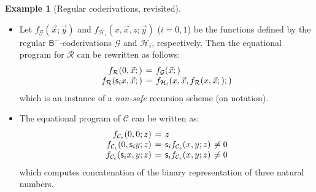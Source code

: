 \documentclass[manuscript,screen]{acmart}
\theoremstyle{definition}
\newtheorem{exmp}[thm]{Example}
\theoremstyle{remark}
\renewcommand{\succ}[1]{\mathsf{s}_{#1}}
\newcommand{\denot}[1]{f_{#1}}
\newcommand{\cconc}{\mathcal{C}}
\newcommand{\successor}{\mathcal{S}}
\newcommand{\primrec}{\mathcal{R}}
\newcommand{\gfunction}{\mathcal{G}}
\newcommand{\hfunction}{\mathcal{H}}
\newcommand{\bc}{\mathsf{B}}
\newcommand{\bcnorec}{\bc^{-}}
\begin{document}
\begin{exmp}[Regular coderivations, revisited]
\begin{itemize}
\item Let $\denot{\gfunction}(\vec x; \vec y)$ and $\denot{\hfunction_i}( x, \vec x, z; \vec y)$ ($i=0,1$) be the functions defined by the  regular  $\bcnorec$-coderivations $\gfunction$ and $\hfunction_i$, respectively. Then the equational program for $\primrec$  can be rewritten as follows:
\begin{equation}
    \label{eq:norm-prim-rec-scheme}
     \arraycolsep=2pt
    \begin{array}{rcll}
 \denot{\primrec}(0, \vec x;) & = & \denot{\gfunction}(\vec x; )\\
  \denot{\primrec}(\succ ix,\vec x; ) & = &\denot{\hfunction_i}( x, \vec x, \denot{\primrec}(x, \vec x; ); )  
\end{array}
\end{equation}
which is an instance of a \emph{non-safe}  recursion scheme (on notation).
    \item The equational program of  $\cconc$ can be written as:
\[
 \arraycolsep=2pt
\begin{array}{rcll}
    \denot{\cconc_{\epsilon}}  (0, 0;z) & = & z\\
     \denot{\cconc_{\epsilon}}  ( 0, \succ i y;z) & = &   \succ i \denot{\cconc_{\epsilon}} ( x, y;z) & \neq 0 \\ 
     \denot{\cconc_{\epsilon}}  (\succ i x, y;z) & = &   \succ i\denot{\cconc_{\epsilon}}  ( x, y;z) & \neq 0 
\end{array}
\]
which computes concatenation of the binary representation of three natural numbers.
\end{itemize}

 

 
\end{exmp}
\end{document}
